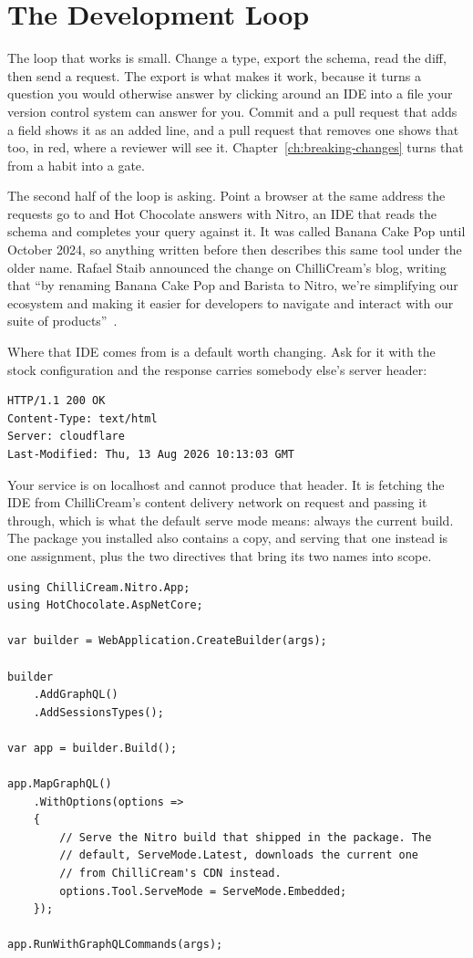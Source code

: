 \section{The Development Loop}
\label{sec:ch02-the-development-loop}

%
The loop that works is small. Change a type, export the schema, read the diff,
then send a request. The export is what makes it work, because it turns a
question you would otherwise answer by clicking around an IDE into a file your
version control system can answer for you. Commit  and a
pull request that adds a field shows it as an added line, and a pull request
that removes one shows that too, in red, where a reviewer will see it.
Chapter~\ref{ch:breaking-changes} turns that from a habit into a gate.

The second half of the loop is asking. Point a browser at the same address the
requests go to and Hot Chocolate answers with Nitro, an IDE that reads the
schema and completes your query against it. It was called Banana Cake Pop
until October 2024, so anything written before then describes this same tool
under the older name. Rafael Staib announced the change on ChilliCream's blog,
writing that
\enquote{by renaming Banana Cake Pop and Barista to Nitro, we're simplifying
our ecosystem and making it easier for developers to navigate and interact
with our suite of products}~\autocite{staib2024nitro}.

%
Where that IDE comes from is a default worth changing. Ask for it with the
stock configuration and the response carries somebody else's server header:

\begin{verbatim}
HTTP/1.1 200 OK
Content-Type: text/html
Server: cloudflare
Last-Modified: Thu, 13 Aug 2026 10:13:03 GMT
\end{verbatim}

Your service is on localhost and cannot produce that header. It is fetching the
IDE from ChilliCream's content delivery network on request and passing it
through, which is what the default serve mode means: always the current build.
The package you installed also contains a copy, and serving that one instead is
one assignment, plus the two  directives that bring its two names
into scope.

\begin{verbatim}
using ChilliCream.Nitro.App;
using HotChocolate.AspNetCore;

var builder = WebApplication.CreateBuilder(args);

builder
    .AddGraphQL()
    .AddSessionsTypes();

var app = builder.Build();

app.MapGraphQL()
    .WithOptions(options =>
    {
        // Serve the Nitro build that shipped in the package. The
        // default, ServeMode.Latest, downloads the current one
        // from ChilliCream's CDN instead.
        options.Tool.ServeMode = ServeMode.Embedded;
    });

app.RunWithGraphQLCommands(args);
\end{verbatim}

